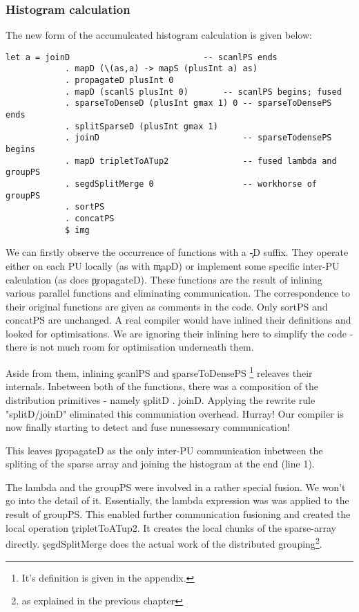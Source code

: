       \subsubsection{Histogram calculation}
        The new form of the accumulcated histogram calculation is given below:
        \begin{lstlisting}
let a = joinD                           -- scanlPS ends
            . mapD (\(as,a) -> mapS (plusInt a) as)
            . propagateD plusInt 0
            . mapD (scanlS plusInt 0)       -- scanlPS begins; fused
            . sparseToDenseD (plusInt gmax 1) 0 -- sparseToDensePS ends
            . splitSparseD (plusInt gmax 1)     
            . joinD                             -- sparseTodensePS begins
            . mapD tripletToATup2               -- fused lambda and groupPS 
            . segdSplitMerge 0                  -- workhorse of groupPS
            . sortPS
            . concatPS
            $ img
        \end{lstlisting}
        We can firstly observe the occurrence of functions with a \c{-D} suffix. They operate either
        on each PU locally (as with \c{mapD}) or implement some specific inter-PU calculation (as does \c{propagateD}).
        These functions are the result of inlining various parallel functions and eliminating communication.
        The correspondence to their original functions are given as comments in the code. Only sortPS and concatPS
        are unchanged. A real compiler would have inlined their definitions and looked for optimisations.
        We are ignoring their inlining here to simplify the code - there is not much room for optimisation underneath them.
        
        
        Aside from them, inlining \c{scanlPS} and \c{sparseToDensePS}
        \footnote[1]{It's definition is given in the appendix.} releaves their internals.
        Inbetween both of the functions, there was a composition of the distribution primitives - namely \c{splitD . joinD}.
        Applying the rewrite rule "splitD/joinD" eliminated this communiation overhead. Hurray! Our compiler
        is now finally starting to detect and fuse nunessesary communication!
        
        This leaves \c{propagateD} as the only inter-PU communication inbetween the spliting of the
        sparse array and joining the histogram at the end (line 1).
        
        The lambda and the groupPS were involved in a rather special fusion. We won't
        go into the detail of it. Essentially, the lambda expression was
        was applied to the result of groupPS. This enabled further communication
        fusioning and created the local operation \c{tripletToATup2}. It creates the
        local chunks of the sparse-array directly. \c{segdSplitMerge} does the
        actual work of the distributed grouping\footnote[2]{as explained in the previous chapter}.
        
